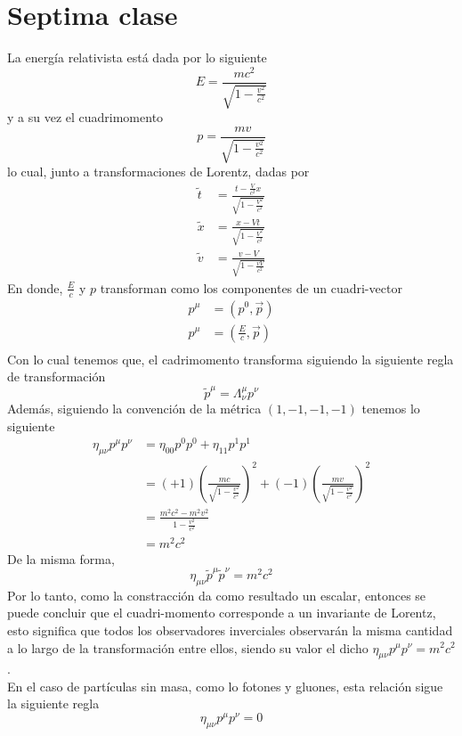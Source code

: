 \documentclass[../main.tex]{subfiles}
\begin{document}
\section{Septima clase}
La energía relativista está dada por lo siguiente
\begin{equation}
  E = \frac{mc^2}{\sqrt{1-\frac{v^2}{c^2}}}
\end{equation}
y a su vez el cuadrimomento 
\begin{equation}
  p= \frac{mv}{\sqrt{1-\frac{v^2}{c^2}}}
\end{equation}
lo cual, junto a transformaciones de Lorentz, dadas por
\begin{align*}
  \tilde{t} & = \frac{t-\frac{V}{c^2} x}{\sqrt{1-\frac{V^2}{c^2}}} \\
  \tilde{x} & = \frac{x-Vt}{\sqrt{1-\frac{V^2}{c^2}}} \\
  \tilde{v} & = \frac{v-V}{\sqrt{1-\frac{vV}{c^2}}}
\end{align*}
En donde, $\frac{E}{c}$ y $p$ transforman como los componentes de un cuadri-vector
\begin{align*}
  p^\mu & = (p^0,\vec{p}) \\
  p^\mu & = \left( \frac{E}{c},\vec{p} \right) \\
\end{align*}
Con lo cual tenemos que, el cadrimomento transforma siguiendo la siguiente regla de transformación
\begin{equation}
  \tilde{p}^\mu=\Lambda_\nu^\mu p^\nu
\end{equation}
Además, siguiendo la convención de la métrica $(1,-1,-1,-1)$ tenemos lo siguiente
\begin{align*}
  \eta_{\mu \nu} p^\mu p^\nu  & = \eta_{00}p^0p^0 + \eta_{11}p^1p^1 \\
  & = (+1)\left( \frac{mc}{\sqrt{1-\frac{v^2}{c^2}}}  \right)^2 + (-1)\left( \frac{mv}{\sqrt{1-\frac{v^2}{c^2}}} \right)^2 \\
  & = \frac{m^2c^2-m^2v^2}{1-\frac{v^2}{c^2}} \\
  & = m^2c^2
\end{align*}
De la misma forma, 
\begin{equation*}
  \eta_{\mu\nu}\tilde{p}^\mu\tilde{p}^\nu = m^2c^2
\end{equation*}
Por lo tanto, como la constracción da como resultado un escalar, entonces se puede concluir que el cuadri-momento corresponde a un invariante de Lorentz, esto significa que todos los observadores inverciales observarán la misma cantidad a lo largo de la transformación entre ellos, siendo su valor el dicho $\eta_{\mu\nu}p^\mu p^\nu=m^2c^2$. \\
En el caso de partículas sin masa, como lo fotones y gluones, esta relación sigue la siguiente regla
\begin{equation*}
  \eta_{\mu \nu}p^\mu p^\nu = 0
\end{equation*}
\end{document}
